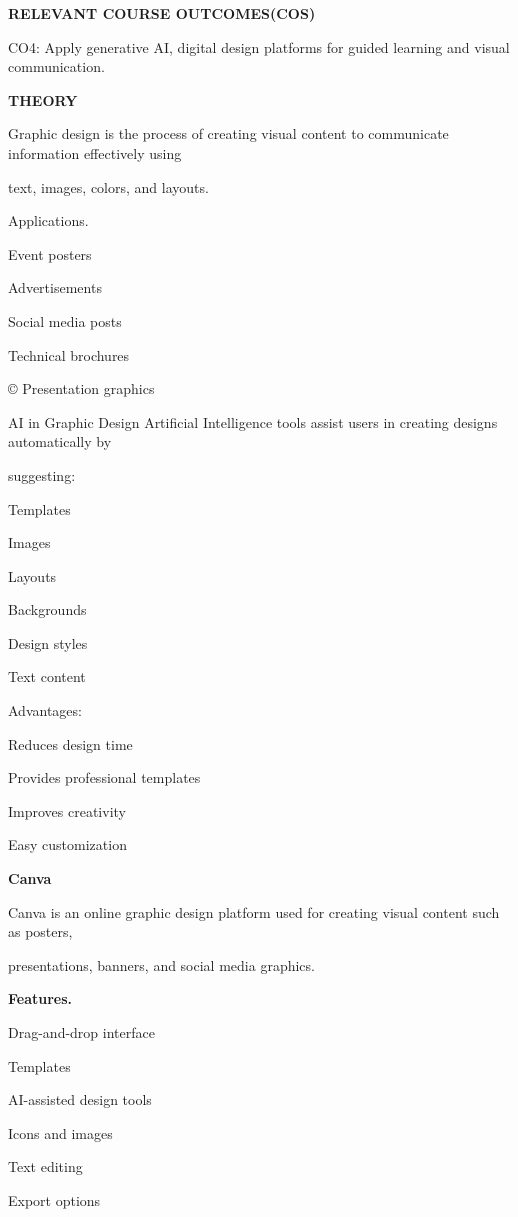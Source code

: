 \documentclass[10pt,a4paper]{article}
\begin{document}
\medskip\noindent\textbf{RELEVANT COURSE OUTCOMES(COS)}\par
\noindent CO4: Apply generative AI, digital design platforms for guided learning and visual communication.\par

\medskip\noindent\textbf{THEORY}\par
\noindent Graphic design is the process of creating visual content to communicate information effectively using\par
\noindent text, images, colors, and layouts.\par
\noindent Applications.\par
\noindent Event posters\par
\noindent Advertisements\par
\noindent Social media posts\par
\noindent Technical brochures\par
\noindent © Presentation graphics\par
\noindent AI in Graphic Design Artificial Intelligence tools assist users in creating designs automatically by\par
\noindent suggesting:\par
\noindent Templates\par
\noindent Images\par
\noindent Layouts\par
\noindent Backgrounds\par
\noindent Design styles\par
\noindent Text content\par

\noindent Advantages:\par
\noindent Reduces design time\par
\noindent Provides professional templates\par
\clearpage
\noindent Improves creativity\par
\noindent Easy customization\par

\medskip\noindent\textbf{Canva}\par
\noindent Canva is an online graphic design platform used for creating visual content such as posters,\par
\noindent presentations, banners, and social media graphics.\par
\medskip\noindent\textbf{Features.}\par
\noindent Drag-and-drop interface\par
\noindent Templates\par
\noindent AI-assisted design tools\par
\noindent Icons and images\par
\noindent Text editing\par
\noindent Export options\par
\end{document}
